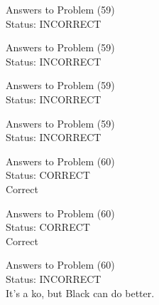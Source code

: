 \documentclass[11pt]{article}
\begin{document}
\begin{minipage}[t]{0.5\textwidth}
  {\centering
  
  Answers to Problem (59)\\
  Status: INCORRECT\\
  
  }
\end{minipage}
\begin{minipage}[t]{0.5\textwidth}
  {\centering
  
  Answers to Problem (59)\\
  Status: INCORRECT\\
  
  }
\end{minipage}
\begin{minipage}[t]{0.5\textwidth}
  {\centering
  
  Answers to Problem (59)\\
  Status: INCORRECT\\
  
  }
\end{minipage}
\begin{minipage}[t]{0.5\textwidth}
  {\centering
  
  Answers to Problem (59)\\
  Status: INCORRECT\\
  
  }
\end{minipage}
\begin{minipage}[t]{0.5\textwidth}
  {\centering
  
  Answers to Problem (60)\\
  Status: CORRECT\\
  Correct\\
  }
\end{minipage}
\begin{minipage}[t]{0.5\textwidth}
  {\centering
  
  Answers to Problem (60)\\
  Status: CORRECT\\
  Correct\\
  }
\end{minipage}
\begin{minipage}[t]{0.5\textwidth}
  {\centering
  
  Answers to Problem (60)\\
  Status: INCORRECT\\
  It's a ko, but Black can do better.\\
  }
\end{minipage}
\end{document}
